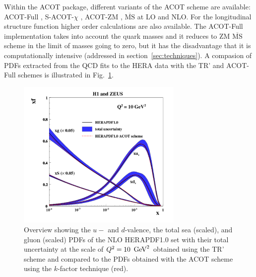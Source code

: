 \begin{description}
\begin{itemize}
%
Within the ACOT package, different variants of the ACOT scheme are available:
ACOT-Full \cite{Aivazis:1993pi}, S-ACOT-$\chi$ \cite{Kramer:2000hn,Kretzer:2003it}, ACOT-ZM \cite{Aivazis:1993pi}, 
$\overline{\text{MS}}$ at LO and NLO. 
For the longitudinal structure function higher order calculations are also available. 
The ACOT-Full implementation takes into account the quark masses 
and it reduces to ZM $\overline{\text{MS}}$ scheme in the limit of masses going to zero, 
but it has the disadvantage that it is computationally intensive (addressed in 
section~\ref{sec:techniques}).
A compasion of PDFs extracted from the QCD fits to the HERA data 
with the TR' and ACOT-Full schemes is illustrated in Fig.~\ref{fig:acotrt}.

\begin{figure}[!ht]
\centering
\includegraphics[width=8cm]{heraacot}
  \caption{Overview showing the $u-$ and $d$-valence, the total sea
    (scaled), and gluon (scaled) PDFs of the NLO HERAPDF1.0 set \cite{h1zeus:2009wt} 
    with their 
    total uncertainty at the scale of $Q^2 = 10\ \GeV^2$ obtained 
    using the TR' scheme and compared to the PDFs obtained with 
    the ACOT scheme using the $k$-factor technique (red).}
 \label{fig:acotrt}
\end{figure}


\end{itemize}
\end{description}

